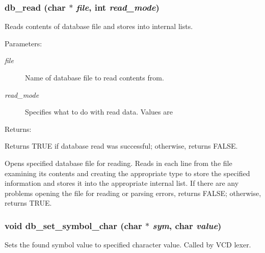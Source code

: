 \subsubsection{ db\_\-read (char $\ast$ {\em file}, int {\em read\_\-mode})}\label{db_8h_a1}


Reads contents of database file and stores into internal lists.

\begin{Desc}
\item[Parameters: ]\par
\begin{description}
\item[{\em 
file}]Name of database file to read contents from. \item[{\em 
read\_\-mode}]Specifies what to do with read data. Values are
\end{description}
\end{Desc}
\begin{Desc}
\item[Returns: ]\par
Returns TRUE if database read was successful; otherwise, returns FALSE.\end{Desc}
Opens specified database file for reading. Reads in each line from the file examining its contents and creating the appropriate type to store the specified information and stores it into the appropriate internal list. If there are any problems opening the file for reading or parsing errors, returns FALSE; otherwise, returns TRUE. 
\subsubsection{\setlength{\rightskip}{0pt plus 5cm}void db\_\-set\_\-symbol\_\-char (char $\ast$ {\em sym}, char {\em value})}\label{db_8h_a16}


Sets the found symbol value to specified character value. Called by VCD lexer.

